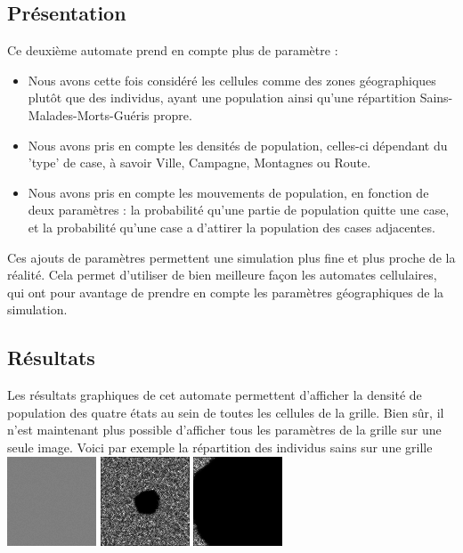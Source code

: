\documentclass{article}
\begin{document}
\subsection{Présentation}
	Ce deuxième automate prend en compte plus de paramètre : 
	\begin{itemize}
	\item Nous avons cette fois considéré les cellules comme des zones géographiques plutôt que des individus, ayant une population ainsi qu'une répartition Sains-Malades-Morts-Guéris propre.
	\item Nous avons pris en compte les densités de population, celles-ci dépendant du 'type' de case, à savoir Ville, Campagne, Montagnes ou Route.
	\item Nous avons pris en compte les mouvements de population, en fonction de deux paramètres : la probabilité qu'une partie de population quitte une case, et la probabilité qu'une case a d'attirer la population des cases adjacentes.
	\end{itemize}
	
	Ces ajouts de paramètres permettent une simulation plus fine et plus proche de la réalité. Cela permet d'utiliser de bien meilleure façon les automates cellulaires, qui ont pour avantage de prendre en compte les paramètres géographiques de la simulation.


\subsection{Résultats}

Les résultats graphiques de cet automate permettent d'afficher la densité de population des quatre états au sein de toutes les cellules de la grille. Bien sûr, il n'est maintenant plus possible d'afficher tous les paramètres de la grille sur une seule image. Voici par exemple la répartition des individus sains sur une grille \\[0.6cm]

\includegraphics[scale=2]{../images/Frame-1.png} 
\includegraphics[scale=2]{../images/Frame-58.png} 
\includegraphics[scale=2]{../images/Frame-221.png}
\end{document}
